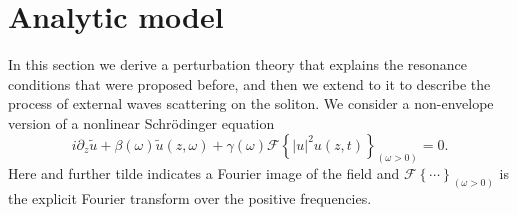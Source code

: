 \documentclass[aps, prl, twocolumn, superscriptaddress, final]{revtex4}
\newcommand{\abs}[1]{\left| #1 \right|}
\begin{document}
\section{Analytic model}%
\label{sec:AnalyticModel}

In this section we derive a perturbation theory that explains the resonance conditions that were proposed before, and then we extend to it to describe the process of external waves scattering on the soliton. We consider a non-envelope version of a nonlinear Schr\"odinger equation~\cite{amiranashvili2010hamiltonian}
\begin{equation}
  \label{eq:GNLSE}
  i \partial_{z} \tilde u
    + \beta(\omega) \tilde u(z, \omega)
    + \gamma(\omega) \mathcal{F} \left\{
      \abs{u}^{2} u(z, t)
    \right\}_{(\omega > 0)} = 0.
\end{equation}
Here and further tilde indicates a Fourier image of the field and $\mathcal{F}\left\{ \cdots \right\}_{(\omega > 0)}$ is the explicit Fourier transform over the positive frequencies.
\end{document}
